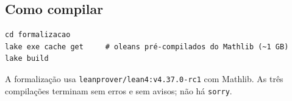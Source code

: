 \subsection*{Como compilar}

\begin{center}
\begin{minipage}{0.9\textwidth}
\begin{verbatim}
cd formalizacao
lake exe cache get     # oleans pré-compilados do Mathlib (~1 GB)
lake build
\end{verbatim}
\end{minipage}
\end{center}

\noindent A formalização usa \texttt{leanprover/lean4:v4.37.0-rc1} com Mathlib. As
três compilações terminam sem erros e sem avisos; não há \texttt{sorry}.
